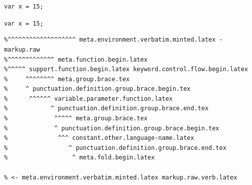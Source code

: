 \documentclass[12pt]{article}
\newcommand\"{quote}
\begin{document}
\lstinline{var x = 15;}

\lstinline|var x = 15;|



\begin{verbatim}
%^^^^^^^^^^^^^^^^^^^ meta.environment.verbatim.minted.latex - markup.raw
%^^^^^^^^^^^^^ meta.function.begin.latex
%^^^^^ support.function.begin.latex keyword.control.flow.begin.latex
%     ^^^^^^^^ meta.group.brace.tex
%     ^ punctuation.definition.group.brace.begin.tex
%      ^^^^^^ variable.parameter.function.latex
%            ^ punctuation.definition.group.brace.end.tex
%             ^^^^^ meta.group.brace.tex
%             ^ punctuation.definition.group.brace.begin.tex
%              ^^^ constant.other.language-name.latex
%                 ^ punctuation.definition.group.brace.end.tex
%                  ^ meta.fold.begin.latex

% <- meta.environment.verbatim.minted.latex markup.raw.verb.latex

  \end{verbatim}
\end{document}
